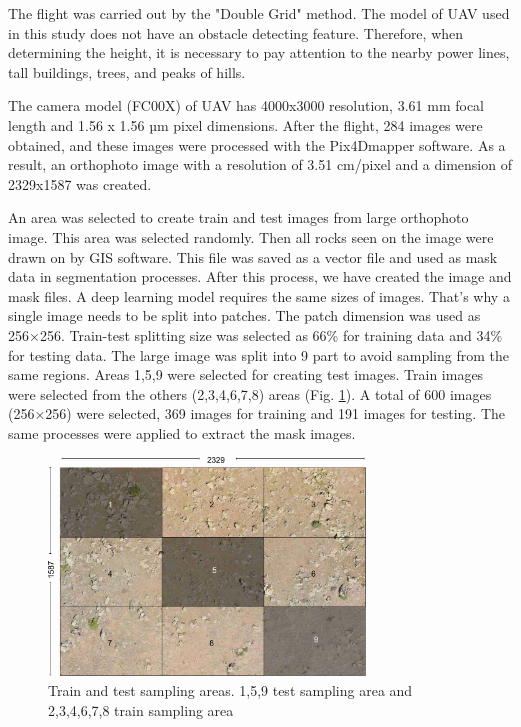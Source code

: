 \documentclass[a4paper,fleqn]{cas-sc}
\begin{document}
The flight was carried out by the "Double Grid" method. The model of UAV used in this study does not have an obstacle detecting feature. Therefore, when determining the height, it is necessary to pay attention to the nearby power lines, tall buildings, trees, and peaks of hills.

The camera model (FC00X) of UAV has 4000x3000 resolution, 3.61 mm focal length and 1.56 x 1.56 µm pixel dimensions. After the flight, 284 images were obtained, and these images were processed with the Pix4Dmapper software. As a result, an orthophoto image with a resolution of 3.51 cm/pixel and a dimension of 2329x1587 was created.

An area was selected to create train and test images from large orthophoto image. This area was selected randomly. Then all rocks seen on the image were drawn on by GIS software. This file was saved as a vector file and used as mask data in segmentation processes. After this process, we have created the image and mask files. 
A deep learning model requires the same sizes of images. That's why a single image needs to be split into patches. The patch dimension was used as 256×256. Train-test splitting size was selected as 66\% for training data and 34\% for testing data. The large image was split into 9 part to avoid sampling from the same regions. Areas 1,5,9 were selected for creating test images. Train images were selected from the others (2,3,4,6,7,8) areas (Fig. \ref{fig:Figure4}). A total of 600 images (256×256) were selected, 369 images for training and 191 images for testing. The same processes were applied to extract the mask images.
\begin{figure}
	\centering
	\includegraphics[width=0.75\textwidth]{figures/fig4.jpg}
	\caption{ Train and test sampling areas. 1,5,9 test sampling area and 2,3,4,6,7,8 train sampling area}
	\label{fig:Figure4}
\end{figure}
\end{document}
